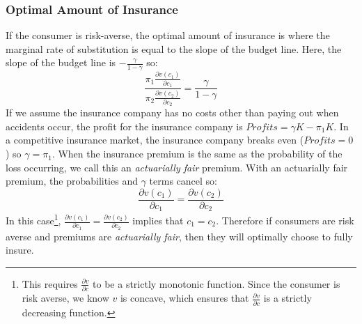\documentclass{article}
\begin{document}
\subsubsection*{Optimal Amount of Insurance}
If the consumer is risk-averse, the optimal amount of insurance is where the marginal rate of substitution is equal to the slope of the budget line. Here, the slope of the budget line is $-\frac{\gamma}{1-\gamma}$ so:
\begin{equation*}
  \frac{\pi_1\frac{\partial v\left(c_1\right)}{\partial c_1}}
          {\pi_2\frac{\partial v\left(c_2\right)}{\partial c_2}}
       =\frac{\gamma}{1-\gamma}
\end{equation*}
If we assume the insurance company has no costs other than paying out when accidents occur, the profit for the insurance company is $Profits =\gamma K - \pi_1 K$. In a competitive insurance market, the insurance company breaks even ($Profits=0$) so $\gamma = \pi_1$. When the insurance premium is the same as the probability of the loss occurring, we call this an \emph{actuarially fair} premium. With an actuarially fair premium, the probabilities and $\gamma$ terms cancel so:
\begin{equation*}
  \frac{\partial v\left(c_1\right)}{\partial c_1}=
  \frac{\partial v\left(c_2\right)}{\partial c_2}
\end{equation*}
In this case\footnote{This requires $\frac{\partial v}{\partial c}$ to be a strictly monotonic function. Since the consumer is risk averse, we know $v$ is concave, which ensures that $\frac{\partial v}{\partial c}$ is a strictly decreasing function.}, $ \frac{\partial v\left(c_1\right)}{\partial c_1}= \frac{\partial v\left(c_2\right)}{\partial c_2}$ implies that $c_1=c_2$.
Therefore if consumers are risk averse and premiums are \emph{actuarially fair}, then they will optimally choose to fully insure.
\end{document}
